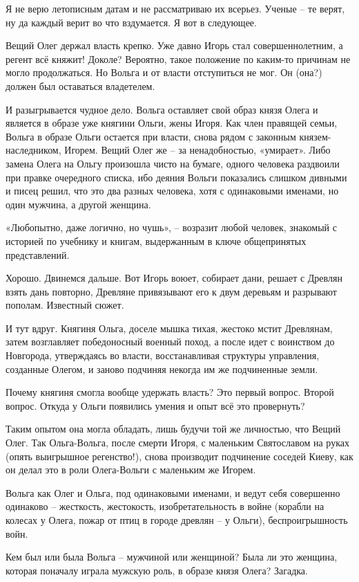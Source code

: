 Я не верю летописным датам и не рассматриваю их всерьез. Ученые – те верят, ну да каждый верит во что вздумается. Я вот в следующее.

Вещий Олег держал власть крепко. Уже давно Игорь стал совершеннолетним, а регент всё княжит! Доколе? Вероятно, такое положение по каким-то причинам не могло продолжаться. Но Вольга и от власти отступиться не мог. Он (она?) должен был оставаться владетелем. 

И разыгрывается чудное дело. Вольга оставляет свой образ князя Олега и является в образе уже княгини Ольги, жены Игоря. Как член правящей семьи, Вольга в образе Ольги остается при власти, снова рядом с законным князем-наследником, Игорем. Вещий Олег же – за ненадобностью, «умирает». Либо замена Олега на Ольгу произошла чисто на бумаге, одного человека раздвоили при правке очередного списка, ибо деяния Вольги показались слишком дивными и писец решил, что это два разных человека, хотя с одинаковыми именами, но один мужчина, а другой женщина.

«Любопытно, даже логично, но чушь», – возразит любой человек, знакомый с историей по учебнику и книгам, выдержанным в ключе общепринятых представлений.

Хорошо. Двинемся дальше. Вот Игорь воюет, собирает дани, решает с Древлян взять дань повторно, Древляне привязывают его к двум деревьям и разрывают пополам. Известный сюжет.

И тут вдруг. Княгиня Ольга, доселе мышка тихая, жестоко мстит Древлянам, затем возглавляет победоносный военный поход, а после идет с воинством до Новгорода, утверждаясь во власти, восстанавливая структуры управления, созданные Олегом, и заново подчиняя некогда им же подчиненные земли.

Почему княгиня смогла вообще удержать власть? Это первый вопрос. Второй вопрос. Откуда у Ольги появились умения и опыт всё это провернуть?

Таким опытом она могла обладать, лишь будучи той же личностью, что Вещий Олег. Так Ольга-Вольга, после смерти Игоря, с маленьким Святославом на руках (опять выигрышное регенство!), снова производит подчинение соседей Киеву, как он делал это в роли Олега-Вольги с маленьким же Игорем. 

Вольга как Олег и Ольга, под одинаковыми именами, и ведут себя совершенно одинаково – жесткость, жестокость, изобретательность в войне (корабли на колесах у Олега, пожар от птиц в городе древлян – у Ольги), беспроигрышность войн.

Кем был или была Вольга – мужчиной или женщиной? Была ли это женщина, которая поначалу играла мужскую роль, в образе князя Олега? Загадка.

